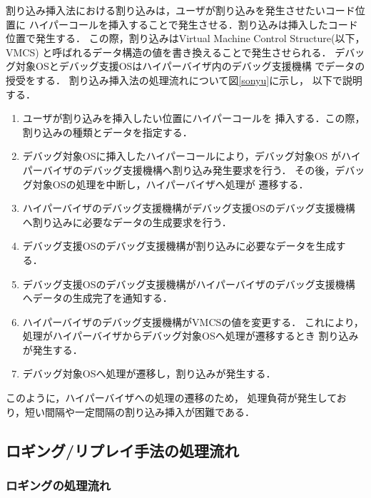 \documentclass[submit,techreq,noauthor,dvipdfmx]{ipsj}
\begin{document}
割り込み挿入法における割り込みは，ユーザが割り込みを発生させたいコード位置に
ハイパーコールを挿入することで発生させる．割り込みは挿入したコード位置で発生する．
この際，割り込みはVirtual Machine Control Structure(以下，VMCS)
と呼ばれるデータ構造の値を書き換えることで発生させられる．
デバッグ対象OSとデバッグ支援OSはハイパーバイザ内のデバッグ支援機構
でデータの授受をする．
割り込み挿入法の処理流れについて図\ref{sonyu}に示し，
以下で説明する．
\begin{enumerate}
    \item
        ユーザが割り込みを挿入したい位置にハイパーコールを
        挿入する．この際，割り込みの種類とデータを指定する．
    \item 
        デバッグ対象OSに挿入したハイパーコールにより，デバッグ対象OS
        がハイパーバイザのデバッグ支援機構へ割り込み発生要求を行う．
        その後，デバッグ対象OSの処理を中断し，ハイパーバイザへ処理が
        遷移する．
    \item 
        ハイパーバイザのデバッグ支援機構がデバッグ支援OSのデバッグ支援機構
        へ割り込みに必要なデータの生成要求を行う．
    \item 
        デバッグ支援OSのデバッグ支援機構が割り込みに必要なデータを生成する．
    \item 
        デバッグ支援OSのデバッグ支援機構がハイパーバイザのデバッグ支援機構
        へデータの生成完了を通知する．
    \item 
        ハイパーバイザのデバッグ支援機構がVMCSの値を変更する．
        これにより，処理がハイパーバイザからデバッグ対象OSへ処理が遷移するとき
        割り込みが発生する．
    \item 
        デバッグ対象OSへ処理が遷移し，割り込みが発生する．
\end{enumerate}

このように，ハイパーバイザへの処理の遷移のため，
処理負荷が発生しており，短い間隔や一定間隔の割り込み挿入が困難である．

\subsection{ロギング/リプレイ手法の処理流れ}\label{sec:processing_flow_rogging/replay_method}

\subsubsection{ロギングの処理流れ}
\end{document}
